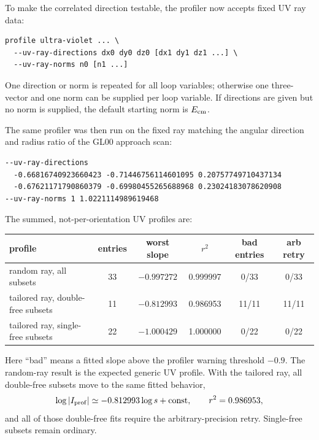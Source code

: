 \documentclass[11pt]{article}
\begin{document}
To make the correlated direction testable, the profiler now accepts fixed UV
ray data:
\begin{verbatim}
profile ultra-violet ... \
  --uv-ray-directions dx0 dy0 dz0 [dx1 dy1 dz1 ...] \
  --uv-ray-norms n0 [n1 ...]
\end{verbatim}
One direction or norm is repeated for all loop variables; otherwise one
three-vector and one norm can be supplied per loop variable.  If directions are
given but no norm is supplied, the default starting norm is $E_{\rm cm}$.

The same profiler was then run on the fixed ray matching the angular direction
and radius ratio of the GL00 approach scan:
\begin{verbatim}
--uv-ray-directions
  -0.66816740923660423 -0.71446756114601095 0.20757749710437134
  -0.67621171790860379 -0.69980455265688968 0.23024183078620908
--uv-ray-norms 1 1.0221114989619468
\end{verbatim}

The summed, not-per-orientation UV profiles are:
\begin{center}
\begin{tabular}{lccccc}
\toprule
profile & entries & worst slope & $r^2$ & bad entries & arb retry\\
\midrule
random ray, all subsets & 33 & $-0.997272$ & 0.999997 & 0/33 & 0/33\\
tailored ray, double-free subsets & 11 & $-0.812993$ & 0.986953 & 11/11 & 11/11\\
tailored ray, single-free subsets & 22 & $-1.000429$ & 1.000000 & 0/22 & 0/22\\
\bottomrule
\end{tabular}
\end{center}
Here ``bad'' means a fitted slope above the profiler warning threshold
$-0.9$.  The random-ray result is the expected generic UV profile.  With the
tailored ray, all double-free subsets move to the same fitted behavior,
\[
  \log |I_{\rm prof}| \simeq -0.812993 \log s + \mathrm{const},
  \qquad r^2=0.986953,
\]
and all of those double-free fits require the arbitrary-precision retry.
Single-free subsets remain ordinary.
\end{document}
